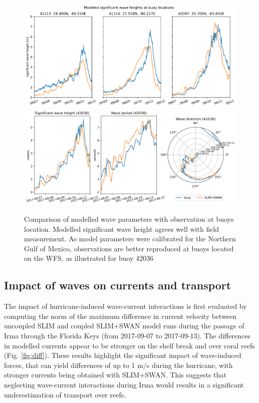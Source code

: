 \documentclass[11pt,a4paper]{article}
\begin{document}
\begin{figure}
    \centering
    \includegraphics[width=.95\textwidth]{fig/hsig_with_map_ww3.png}
    \includegraphics[width=.95\textwidth]{fig/waves_ww3_5km-00002.png}
    \caption{Comparison of modelled wave parameters with observation at buoys location. Modelled significant wave height agrees well with field measurement. As model parameters were calibrated for the Northern Gulf of Mexico, observations are better reproduced at buoys located on the WFS, as illustrated for buoy 42036}
    \label{fig:waves}
\end{figure}

\subsection{Impact of waves on currents and transport}

The impact of hurricane-induced wave-current interactions is first evaluated by computing the norm of the maximum difference in current velocity between uncoupled SLIM and coupled SLIM+SWAN model runs during the passage of Irma through the Florida Keys (from 2017-09-07 to 2017-09-13). The differences in modelled currents appear to be stronger on the shelf break and over coral reefs (Fig. \ref{fig:diff}). These results highlight the significant impact of wave-induced forces, that can yield differences of up to 1 m/s during the hurricane, with stronger currents being obtained with SLIM+SWAN. This suggests that neglecting wave-current interactions during Irma would results in a significant underestimation of transport over reefs.
\end{document}
